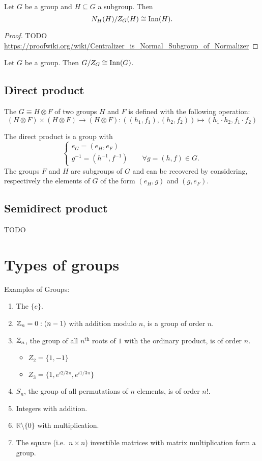 \begin{theorem}[N/C theorem]
Let $G$ be a group and $H\subseteq G$ a subgroup. Then
\[ N_H(H) / Z_G(H) \cong \operatorname{Inn}(H). \]
\end{theorem}
\begin{proof}
TODO \url{https://proofwiki.org/wiki/Centralizer_is_Normal_Subgroup_of_Normalizer}
\end{proof}
\begin{corollary}
Let $G$ be a group. Then $G / Z_G \cong \operatorname{Inn}(G)$.
\end{corollary}


\subsection{Direct product}
\begin{definition}
The  $G \equiv H\otimes F$ of two groups $H$ and $F$ is defined with the following operation:
\[ (H\otimes F) \times (H\otimes F) \rightarrow (H\otimes F): ((h_1,f_1),(h_2,f_2)) \mapsto (h_1\cdot h_2, f_1\cdot f_2)\]
\end{definition}
The direct product is a group with
\[ \begin{cases}
e_G = (e_H,e_F) \\
g^{-1} = (h^{-1}, f^{-1})\qquad \forall g = (h,f) \in G.
\end{cases} \]
The groups $F$ and $H$ are subgroups of $G$ and can be recovered by considering, respectively the elements of $G$ of the form $(e_H, g)$ and $(g ,e_F)$.

\subsection{Semidirect product}
TODO

\section{Types of groups}
\begin{example}
Examples of Groups:
\begin{enumerate}
\item The  $\{e\}$.
\item $\mathbb{Z}_n = 0:(n-1)$ with addition modulo $n$, is a group of order $n$.
\item $\mathbb{Z}_n$, the group of all $n^{\text{th}}$ roots of $1$ with the ordinary product, is of order $n$.
\begin{itemize}
\item $Z_2 = \{1,-1\}$
\item $Z_3 = \{1, e^{i2/3\pi}, e^{i1/3\pi}\}$
\end{itemize}
\item $S_n$, the group of all permutations of $n$ elements, is of order $n!$.
\item Integers with addition.
\item $\mathbb{R}\setminus\{0\}$ with multiplication.
\item The square (i.e.\ $n\times n$) invertible matrices with matrix multiplication form a group.
\end{enumerate}
\end{example}

